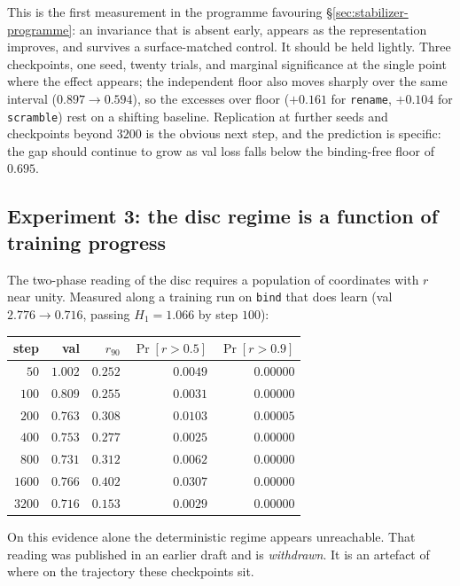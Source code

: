 This is the first measurement in the programme favouring
\S\ref{sec:stabilizer-programme}: an invariance that is absent early, appears
as the representation improves, and survives a surface-matched control. It
should be held lightly. Three checkpoints, one seed, twenty trials, and
marginal significance at the single point where the effect appears; the
independent floor also moves sharply over the same interval ($0.897\to0.594$),
so the excesses over floor ($+0.161$ for \texttt{rename}, $+0.104$ for
\texttt{scramble}) rest on a shifting baseline. Replication at further seeds
and checkpoints beyond $3200$ is the obvious next step, and the prediction is
specific: the gap should continue to grow as val loss falls below the
binding-free floor of $0.695$.

\subsection{Experiment 3: the disc regime is a function of training progress}
\label{sec:regime-negative}

The two-phase reading of the disc requires a population of coordinates with
$r$ near unity. Measured along a training run on \texttt{bind} that does learn
(val $2.776\to0.716$, passing $H_1=1.066$ by step $100$):

\begin{center}
\begin{tabular}{rrrrr}
\hline
step & val & $r_{90}$ & $\Pr[r>0.5]$ & $\Pr[r>0.9]$ \\
\hline
$50$   & $1.002$ & $0.252$ & $0.0049$ & $0.00000$ \\
$100$  & $0.809$ & $0.255$ & $0.0031$ & $0.00000$ \\
$200$  & $0.763$ & $0.308$ & $0.0103$ & $0.00005$ \\
$400$  & $0.753$ & $0.277$ & $0.0025$ & $0.00000$ \\
$800$  & $0.731$ & $0.312$ & $0.0062$ & $0.00000$ \\
$1600$ & $0.766$ & $0.402$ & $0.0307$ & $0.00000$ \\
$3200$ & $0.716$ & $0.153$ & $0.0029$ & $0.00000$ \\
\hline
\end{tabular}
\end{center}

On this evidence alone the deterministic regime appears unreachable. That
reading was published in an earlier draft and is \emph{withdrawn}. It is an
artefact of where on the trajectory these checkpoints sit.

